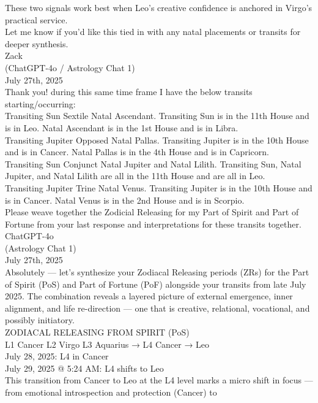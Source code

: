 \documentclass{article}
\begin{document}
These two signals work best when Leo's creative confidence is anchored
in Virgo's practical service.\\
Let me know if you'd like this tied in with any natal placements or
transits for deeper synthesis.\\
Zack\\
(ChatGPT-4o / Astrology Chat 1)\\
July 27th, 2025\\
Thank you! during this same time frame I have the below transits
starting/occurring:\\
Transiting Sun Sextile Natal Ascendant. Transiting Sun is in the 11th
House and is in Leo. Natal Ascendant is in the 1st House and is in
Libra.\\
Transiting Jupiter Opposed Natal Pallas. Transiting Jupiter is in the
10th House and is in Cancer. Natal Pallas is in the 4th House and is in
Capricorn.\\
Transiting Sun Conjunct Natal Jupiter and Natal Lilith. Transiting Sun,
Natal Jupiter, and Natal Lilith are all in the 11th House and are all in
Leo.\\
Transiting Jupiter Trine Natal Venus. Transiting Jupiter is in the 10th
House and is in Cancer. Natal Venus is in the 2nd House and is in
Scorpio.\\
Please weave together the Zodicial Releasing for my Part of Spirit and
Part of Fortune from your last response and interpretations for these
transits together.\\
ChatGPT-4o\\
(Astrology Chat 1)\\
July 27th, 2025\\
Absolutely --- let's synthesize your Zodiacal Releasing periods (ZRs)
for the Part of Spirit (PoS) and Part of Fortune (PoF) alongside your
transits from late July 2025. The combination reveals a layered picture
of external emergence, inner alignment, and life re-direction --- one
that is creative, relational, vocational, and possibly initiatory.\\
 ZODIACAL RELEASING FROM SPIRIT (PoS)\\
L1 Cancer \textbar{} L2 Virgo \textbar{} L3 Aquarius → L4 Cancer → Leo\\
July 28, 2025: L4 in Cancer\\
July 29, 2025 @ 5:24 AM: L4 shifts to Leo\\
This transition from Cancer to Leo at the L4 level marks a micro shift
in focus --- from emotional introspection and protection (Cancer) to
\end{document}
